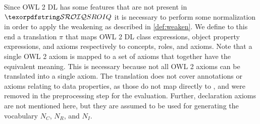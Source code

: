 
Since OWL 2 DL has some features that are not present in $\SROIQ$ it is necessary to perform some normalization in order to apply the weakening as described in \cref{def:weaken}. We define to this end a translation $\pi$ that maps OWL 2 DL class expressions, object property expressions, and axioms respectively to \SROIQ concepts, roles, and axioms. Note that a single OWL 2 axiom is mapped to a set of \SROIQ axioms that together have the equivalent meaning. This is necessary because not all OWL 2 axioms can be translated into a single \SROIQ axiom. The translation does not cover annotations or axioms relating to data properties, as those do not map directly to \SROIQ, and were removed in the preprocessing step for the evaluation. Further, declaration axioms are not mentioned here, but they are assumed to be used for generating the vocabulary $N_C$, $N_R$, and $N_I$.

